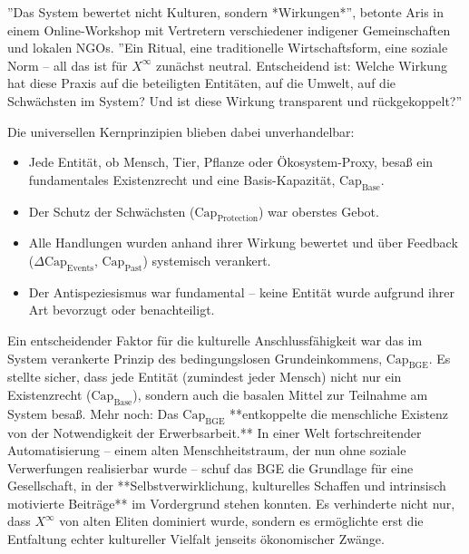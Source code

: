\documentclass[12pt, ngerman, parskip=full]{scrartcl} %
\begin{document}
''Das System bewertet nicht Kulturen, sondern *Wirkungen*'', betonte Aris in einem Online-Workshop mit Vertretern verschiedener indigener Gemeinschaften und lokalen NGOs. ''Ein Ritual, eine traditionelle Wirtschaftsform, eine soziale Norm – all das ist für $X^{\infty}$ zunächst neutral. Entscheidend ist: Welche Wirkung hat diese Praxis auf die beteiligten Entitäten, auf die Umwelt, auf die Schwächsten im System? Und ist diese Wirkung transparent und rückgekoppelt?''

Die universellen Kernprinzipien blieben dabei unverhandelbar:
\begin{itemize}
    \item Jede Entität, ob Mensch, Tier, Pflanze oder Ökosystem-Proxy, besaß ein fundamentales Existenzrecht und eine Basis-Kapazität, $\text{Cap}_{\text{Base}}$.
    \item Der Schutz der Schwächsten ($\text{Cap}_{\text{Protection}}$) war oberstes Gebot.
    \item Alle Handlungen wurden anhand ihrer Wirkung bewertet und über Feedback ($\Delta \text{Cap}_{\text{Events}}$, $\text{Cap}_{\text{Past}}$) systemisch verankert.
    \item Der Antispeziesismus war fundamental – keine Entität wurde aufgrund ihrer Art bevorzugt oder benachteiligt.
\end{itemize}

Ein entscheidender Faktor für die kulturelle Anschlussfähigkeit war das im System verankerte Prinzip des bedingungslosen Grundeinkommens, $\text{Cap}_{\text{BGE}}$. Es stellte sicher, dass jede Entität (zumindest jeder Mensch) nicht nur ein Existenzrecht ($\text{Cap}_{\text{Base}}$), sondern auch die basalen Mittel zur Teilnahme am System besaß. Mehr noch: Das $\text{Cap}_{\text{BGE}}$ **entkoppelte die menschliche Existenz von der Notwendigkeit der Erwerbsarbeit.** In einer Welt fortschreitender Automatisierung – einem alten Menschheitstraum, der nun ohne soziale Verwerfungen realisierbar wurde – schuf das BGE die Grundlage für eine Gesellschaft, in der **Selbstverwirklichung, kulturelles Schaffen und intrinsisch motivierte Beiträge** im Vordergrund stehen konnten. Es verhinderte nicht nur, dass $X^{\infty}$ von alten Eliten dominiert wurde, sondern es ermöglichte erst die Entfaltung echter kultureller Vielfalt jenseits ökonomischer Zwänge.
\end{document}
